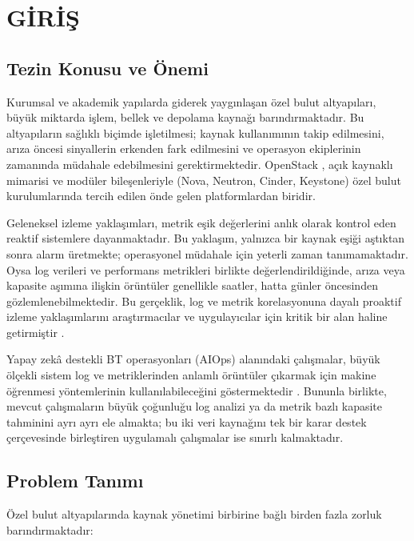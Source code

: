 \chapter{GİRİŞ}
\label{ch:giris}

\section{Tezin Konusu ve Önemi}

Kurumsal ve akademik yapılarda giderek yaygınlaşan özel bulut altyapıları, büyük miktarda işlem, bellek ve depolama kaynağı barındırmaktadır.
Bu altyapıların sağlıklı biçimde işletilmesi; kaynak kullanımının takip edilmesini, arıza öncesi sinyallerin erkenden fark edilmesini ve operasyon ekiplerinin zamanında müdahale edebilmesini gerektirmektedir.
OpenStack \autocite{openstack2024}, açık kaynaklı mimarisi ve modüler bileşenleriyle (Nova, Neutron, Cinder, Keystone) özel bulut kurulumlarında tercih edilen önde gelen platformlardan biridir.

Geleneksel izleme yaklaşımları, metrik eşik değerlerini anlık olarak kontrol eden reaktif sistemlere dayanmaktadır.
Bu yaklaşım, yalnızca bir kaynak eşiği aştıktan sonra alarm üretmekte; operasyonel müdahale için yeterli zaman tanımamaktadır.
Oysa log verileri ve performans metrikleri birlikte değerlendirildiğinde, arıza veya kapasite aşımına ilişkin örüntüler genellikle saatler, hatta günler öncesinden gözlemlenebilmektedir.
Bu gerçeklik, log ve metrik korelasyonuna dayalı proaktif izleme yaklaşımlarını araştırmacılar ve uygulayıcılar için kritik bir alan haline getirmiştir \autocite{notaro2021}.

Yapay zekâ destekli BT operasyonları (AIOps) alanındaki çalışmalar, büyük ölçekli sistem log ve metriklerinden anlamlı örüntüler çıkarmak için makine öğrenmesi yöntemlerinin kullanılabileceğini göstermektedir \autocite{dang2019}.
Bununla birlikte, mevcut çalışmaların büyük çoğunluğu log analizi ya da metrik bazlı kapasite tahminini ayrı ayrı ele almakta; bu iki veri kaynağını tek bir karar destek çerçevesinde birleştiren uygulamalı çalışmalar ise sınırlı kalmaktadır.


\section{Problem Tanımı}

Özel bulut altyapılarında kaynak yönetimi birbirine bağlı birden fazla zorluk barındırmaktadır:

